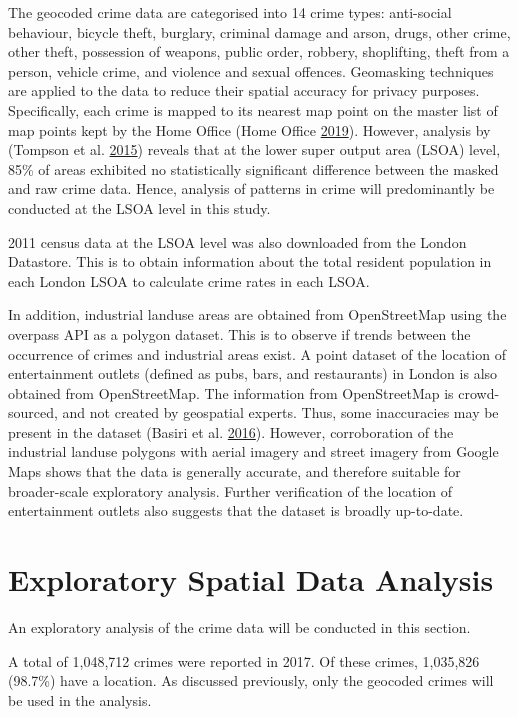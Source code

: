 \documentclass[]{article}
\theoremstyle{definition}
\theoremstyle{definition}
\theoremstyle{definition}
\theoremstyle{remark}
\begin{document}
The geocoded crime data are categorised into 14 crime types: anti-social
behaviour, bicycle theft, burglary, criminal damage and arson, drugs,
other crime, other theft, possession of weapons, public order, robbery,
shoplifting, theft from a person, vehicle crime, and violence and sexual
offences. Geomasking techniques are applied to the data to reduce their
spatial accuracy for privacy purposes. Specifically, each crime is
mapped to its nearest map point on the master list of map points kept by
the Home Office (Home Office \protect\hyperlink{ref-Office2019}{2019}).
However, analysis by (Tompson et al.
\protect\hyperlink{ref-Tompson2015}{2015}) reveals that at the lower
super output area (LSOA) level, 85\% of areas exhibited no statistically
significant difference between the masked and raw crime data. Hence,
analysis of patterns in crime will predominantly be conducted at the
LSOA level in this study.

2011 census data at the LSOA level was also downloaded from the London
Datastore. This is to obtain information about the total resident
population in each London LSOA to calculate crime rates in each LSOA.

In addition, industrial landuse areas are obtained from OpenStreetMap
using the overpass API as a polygon dataset. This is to observe if
trends between the occurrence of crimes and industrial areas exist. A
point dataset of the location of entertainment outlets (defined as pubs,
bars, and restaurants) in London is also obtained from OpenStreetMap.
The information from OpenStreetMap is crowd-sourced, and not created by
geospatial experts. Thus, some inaccuracies may be present in the
dataset (Basiri et al. \protect\hyperlink{ref-Basiri2016}{2016}).
However, corroboration of the industrial landuse polygons with aerial
imagery and street imagery from Google Maps shows that the data is
generally accurate, and therefore suitable for broader-scale exploratory
analysis. Further verification of the location of entertainment outlets
also suggests that the dataset is broadly up-to-date.

\pagebreak

\section{Exploratory Spatial Data
Analysis}\label{exploratory-spatial-data-analysis}

An exploratory analysis of the crime data will be conducted in this
section.

A total of 1,048,712 crimes were reported in 2017. Of these crimes,
1,035,826 (98.7\%) have a location. As discussed previously, only the
geocoded crimes will be used in the analysis.
\end{document}
